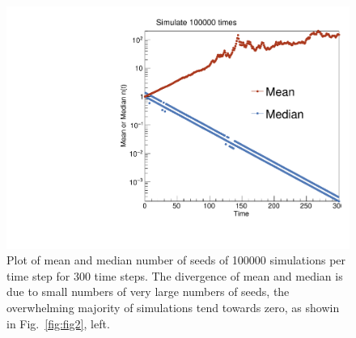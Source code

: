 \documentclass{article}
\begin{document}
\begin{figure}[H]
    \centering
    \includegraphics[width=.7\textwidth]{betHedgeMeanMedian.pdf} 
    \caption{Plot of mean and median number of seeds of 100000 simulations per time step for 300 time steps. The divergence of mean and median is due to small numbers of very large numbers of seeds, the overwhelming majority of simulations tend towards zero, as showin in Fig.~\ref{fig:fig2}, left.}
    \label{fig:fig3}
\end{figure}
\end{document}
